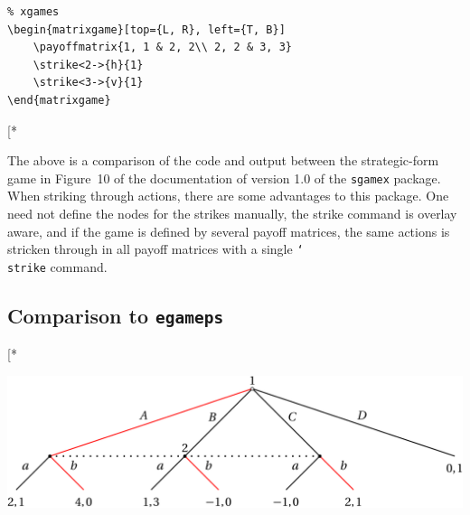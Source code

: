 \documentclass{article}
\makeatletter
\newcounter{fox}
\def\fox{\@ifstar\@fox\@@fox}
\def\@@fox{\@ifnextchar[{\fox@opt}{\fox@bgt}}
\renewcommand{\textbackslash}{\char`\\}
\def\cmd#1{\texttt{\color{cmd}\textbackslash#1}}
\def\largeskip{\vskip9pt plus 3pt minus 3pt}
\makeatother
\begin{document}
\noindent
\begin{minipage}{0.7\textwidth}
\begin{verbatim}
% xgames
\begin{matrixgame}[top={L, R}, left={T, B}]
	\payoffmatrix{1, 1 & 2, 2\\ 2, 2 & 3, 3}
	\strike<2->{h}{1}
	\strike<3->{v}{1}
\end{matrixgame}
\end{verbatim}
\end{minipage}\hspace{0.01\textwidth}%
\begin{minipage}{0.28\textwidth}
\fox*{
\begin{center}\vspace{3.3mm}
\hspace{-3.5mm}\begin{matrixgame}[top={L, R}, left={T, B}]
\end{matrixgame}\vspace{4.8mm}
\end{center}
}
\end{minipage}
\largeskip

The above is a comparison of the code and output between the strategic-form game in Figure~10 of the documentation of version 1.0 of the \texttt{sgamex} package. When striking through actions, there are some advantages to this package. One need not define the nodes for the strikes manually, the strike command is overlay aware, and if the game is defined by several payoff matrices, the same actions is stricken through in all payoff matrices with a single \cmd{strike} command.

\subsection{Comparison to \texttt{egameps}}

\fox*{
\begin{center}
\includegraphics[scale=0.8]{egameps}
\end{center}
}
\end{document}
